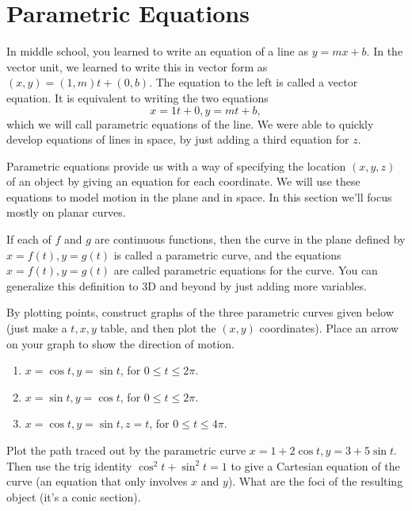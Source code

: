 
\section{Parametric Equations}
In middle school, you learned to write an equation of a line as $y=mx+b$.  In the vector unit, we learned to write this in vector form as $(x,y)=(1,m)t+(0,b)$. The equation to the left is called a vector equation.  It is equivalent to writing the two equations $$x=1t+0,y=mt+b,$$ which we will call parametric equations of the line. We were able to quickly develop equations of lines in space, by just adding a third equation for $z$.

Parametric equations provide us with a way of specifying the location $(x,y,z)$ of an object by giving an equation for each coordinate.  We will use these equations to model motion in the plane and in space.  In this section we'll focus mostly on planar curves.

\begin{definition}
If each of $f$ and $g$ are continuous functions, then the curve in the plane defined by $x=f(t),y=g(t)$ is called a parametric curve, and the equations $x=f(t),y=g(t)$ are called parametric equations for the curve. You can generalize this definition to 3D and beyond by just adding more variables.
\end{definition}

\begin{problem} 
By plotting points, construct graphs of the three parametric curves given below (just make a $t,x,y$ table, and then plot the $(x,y)$ coordinates).  Place an arrow on your graph to show the direction of motion.
\begin{enumerate}
\item $x=\cos t, y=\sin t$, for $0\leq t\leq 2\pi$.
\item $x=\sin t, y=\cos t$, for $0\leq t\leq 2\pi$.
\item $x=\cos t, y=\sin t, z=t$, for $0\leq t\leq 4\pi$.
\end{enumerate} 
\end{problem}

\begin{problem}
Plot the path traced out by the parametric curve $x=1+2\cos t, y=3+5\sin t$.  Then use the trig identity $\cos^2t+\sin^2t=1$ to give a Cartesian equation of the curve (an equation that only involves $x$ and $y$). What are the foci of the resulting object (it's a conic section).
\end{problem}

